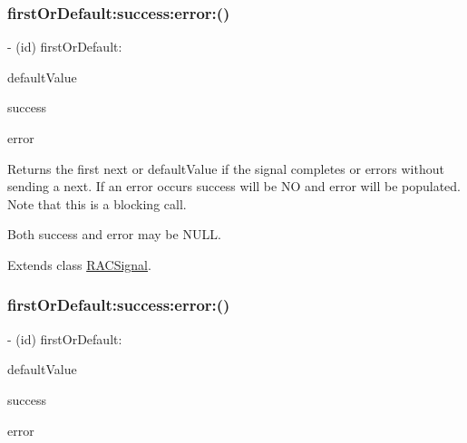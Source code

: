 \subsubsection{\texorpdfstring{first\+Or\+Default\+:success\+:error\+:()}{firstOrDefault:success:error:()}\hspace{0.1cm}{\footnotesize\ttfamily [1/3]}}
{\footnotesize\ttfamily -\/ (id) first\+Or\+Default\+: \begin{DoxyParamCaption}\item[{(id)}]{default\+Value }\item[{success:(B\+O\+OL $\ast$)}]{success }\item[{error:(N\+S\+Error $\ast$$\ast$)}]{error }\end{DoxyParamCaption}}

Returns the first {\ttfamily next} or {\ttfamily default\+Value} if the signal completes or errors without sending a {\ttfamily next}. If an error occurs success will be NO and error will be populated. Note that this is a blocking call.

Both success and error may be N\+U\+LL. 

Extends class \mbox{\hyperlink{interface_r_a_c_signal_a12b765a16842e9c7aa1d13b00d8df09b}{R\+A\+C\+Signal}}.

\mbox{\label{category_r_a_c_signal_07_operations_08_a12b765a16842e9c7aa1d13b00d8df09b}} 
\subsubsection{\texorpdfstring{first\+Or\+Default\+:success\+:error\+:()}{firstOrDefault:success:error:()}\hspace{0.1cm}{\footnotesize\ttfamily [2/3]}}
{\footnotesize\ttfamily -\/ (id) first\+Or\+Default\+: \begin{DoxyParamCaption}\item[{(id)}]{default\+Value }\item[{success:(B\+O\+OL $\ast$)}]{success }\item[{error:(N\+S\+Error $\ast$$\ast$)}]{error }\end{DoxyParamCaption}}

